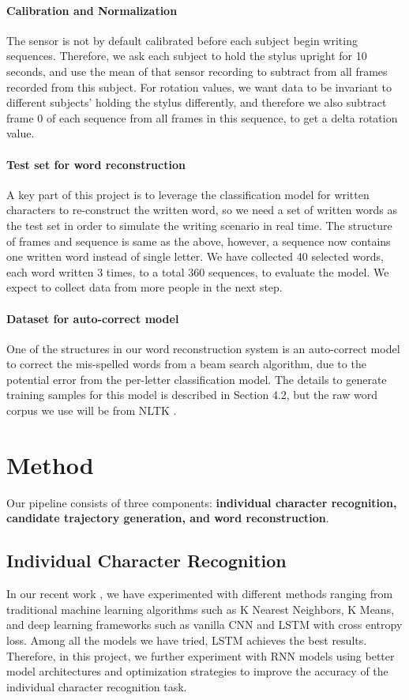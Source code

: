 \documentclass{article}
\begin{document}
\begin{multicols*}{2}
\paragraph{Calibration and Normalization} 
The sensor is not by default calibrated before each subject begin writing sequences. Therefore, we ask each subject to hold the stylus upright for 10 seconds, and use the mean of that sensor recording to subtract from all frames recorded from this subject. For rotation values, we want data to be invariant to different subjects' holding the stylus differently, and therefore we also subtract frame 0 of each sequence from all frames in this sequence, to get a delta rotation value.

\paragraph{Test set for word reconstruction} 
A key part of this project is to leverage the classification model for written characters to re-construct the written word, so we need a set of written words as the test set in order to simulate the writing scenario in real time. The structure of frames and sequence is same as the above, however, a sequence now contains one written word instead of single letter. We have collected 40 selected words, each word written 3 times, to a total 360 sequences, to evaluate the model. We expect to collect data from more people in the next step.

\paragraph{Dataset for auto-correct model} 
One of the structures in our word reconstruction system is an auto-correct model to correct the mis-spelled words from a beam search algorithm, due to the potential error from the per-letter classification model. The details to generate training samples for this model is described in Section 4.2, but the raw word corpus we use will be from NLTK \cite{nltk}.

\section{Method}

Our pipeline consists of three components: \textbf{individual character recognition, candidate trajectory generation, and word reconstruction}.

\subsection{Individual Character Recognition}
In our recent work \cite{ours}, we have experimented with different methods ranging from traditional machine learning algorithms such as K Nearest Neighbors\cite{knn}, K Means\cite{kmeans}, and deep learning frameworks such as vanilla CNN\cite{lenet} and LSTM\cite{lstm} with cross entropy loss. Among all the models we have tried, LSTM achieves the best results. Therefore, in this project, we further experiment with RNN models using better model architectures and optimization strategies to improve the accuracy of the individual character recognition task.


\end{multicols*}
\end{document}
